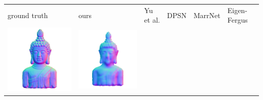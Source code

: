\begin{tabularx}{\linewidth}{@{}Y@{}Y@{}Y@{}Y@{}Y@{}Y@{}}
ground truth & ours & Yu et al. & DPSN & MarrNet & Eigen-Fergus \\
\includegraphics[width=\linewidth]{semisynthetic/20160617_16_gt.png} &
\includegraphics[width=\linewidth]{semisynthetic/20160617_16_ours_out.png} &

\end{tabularx}
